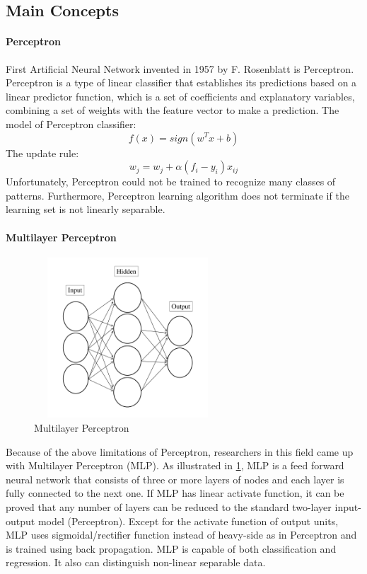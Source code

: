 \documentclass[conference]{IEEEtran}
\begin{document}
\subsection{Main Concepts}
\paragraph{Perceptron}
First Artificial Neural Network invented in 1957 by F. Rosenblatt is Perceptron. Perceptron is a type of linear classifier that establishes its predictions based on a linear predictor function, which is a set of coefficients and explanatory variables, combining a set of weights with the feature vector to make a prediction\cite{perceptron}.
The model of Perceptron classifier:\[f(x) = sign({w^T}x + b)\]
The update rule: \[{w_j} = {w_j} + \alpha \left( {{f_i} - {y_i}} \right){x_{ij}}\] 
Unfortunately, Perceptron could not be trained to recognize many classes of patterns. Furthermore, Perceptron learning algorithm does not terminate if the learning set is not linearly separable.
\paragraph{Multilayer Perceptron}
\begin{figure}[tmbh]
\centering
\includegraphics[width=7cm,height = 6cm]{mlp.pdf}
\caption{Multilayer Perceptron}
\label{figure:MLP}
\end{figure}
Because of the above limitations of Perceptron, researchers in this field came up with Multilayer Perceptron (MLP). As illustrated in \cref{figure:MLP}, MLP is a feed forward neural network that consists of three or more layers of nodes and each layer is fully connected to the next one\cite{Aizenberg07multilayerfeedforward}. If MLP has linear activate function, it can be proved that any number of layers can be reduced to the standard two-layer input-output model (Perceptron). Except for the activate function of output units, MLP uses sigmoidal/rectifier function instead of heavy-side as in Perceptron and is trained using back propagation\cite{CybenkoApproxSidmoid}. MLP is capable of both classification and regression. It also can distinguish non-linear separable data.
\end{document}
